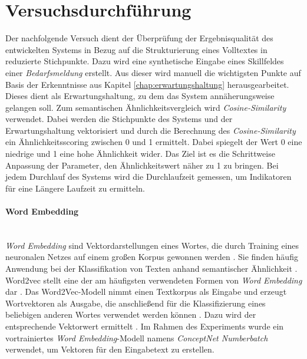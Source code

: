 \section{Versuchsdurchführung}
Der nachfolgende Versuch dient der Überprüfung der Ergebnisqualität des entwickelten Systems in Bezug auf die Strukturierung eines Volltextes in reduzierte Stichpunkte. Dazu wird eine synthetische Eingabe eines Skillfeldes einer \emph{Bedarfsmeldung} erstellt. Aus dieser wird manuell die wichtigsten Punkte auf Basis der Erkenntnisse aus Kapitel \ref{chap:erwartungshaltung} herausgearbeitet. Dieses dient als Erwartungshaltung, zu dem das System annäherungsweise gelangen soll. Zum semantischen Ähnlichkeitsvergleich wird \emph{Cosine-Similarity} verwendet. Dabei werden die Stichpunkte des Systems und der Erwartungshaltung vektorisiert und durch die Berechnung des \emph{Cosine-Similarity} ein Ähnlichkeitsscoring zwischen 0 und 1 ermittelt. Dabei spiegelt der Wert 0 eine niedrige und 1 eine hohe Ähnlichkeit wider. Das Ziel ist es die Schrittweise Anpassung der Parameter, den Ähnlichkeitswert näher zu 1 zu bringen. Bei jedem Durchlauf des Systems wird die Durchlaufzeit gemessen, um Indikatoren für eine Längere Laufzeit zu ermitteln.
\paragraph{Word Embedding}\mbox{}\\
\emph{Word Embedding} sind Vektordarstellungen eines Wortes, die durch Training eines neuronalen Netzes auf einem großen Korpus gewonnen werden \cite{sitikhu2019comparison}. Sie finden häufig Anwendung bei der Klassifikation von Texten anhand semantischer Ähnlichkeit \cite{sitikhu2019comparison}. Word2vec stellt eine der am häufigsten verwendeten Formen von \emph{Word Embedding} dar \cite{sitikhu2019comparison}. Das Word2Vec-Modell nimmt einen Textkorpus als Eingabe und erzeugt Wortvektoren als Ausgabe, die anschließend für die Klassifizierung eines beliebigen anderen Wortes verwendet werden können \cite{sitikhu2019comparison}. Dazu wird der entsprechende Vektorwert ermittelt \cite{sitikhu2019comparison}. Im Rahmen des Experiments wurde ein vortrainiertes \emph{Word Embedding}-Modell namens \emph{ConceptNet Numberbatch} \cite{speer2017conceptnet} verwendet, um Vektoren für den Eingabetext zu erstellen.
